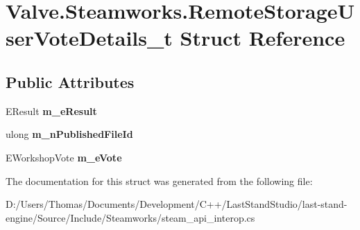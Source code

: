 \hypertarget{structValve_1_1Steamworks_1_1RemoteStorageUserVoteDetails__t}{}\section{Valve.\+Steamworks.\+Remote\+Storage\+User\+Vote\+Details\+\_\+t Struct Reference}
\label{structValve_1_1Steamworks_1_1RemoteStorageUserVoteDetails__t}
\subsection*{Public Attributes}
\begin{DoxyCompactItemize}
\item 
\hypertarget{structValve_1_1Steamworks_1_1RemoteStorageUserVoteDetails__t_aded5ded451f9b1c8fd76ea23b7223560}{}E\+Result {\bfseries m\+\_\+e\+Result}\label{structValve_1_1Steamworks_1_1RemoteStorageUserVoteDetails__t_aded5ded451f9b1c8fd76ea23b7223560}

\item 
\hypertarget{structValve_1_1Steamworks_1_1RemoteStorageUserVoteDetails__t_a242a1da18fe77c1ed70e9a0a491e975a}{}ulong {\bfseries m\+\_\+n\+Published\+File\+Id}\label{structValve_1_1Steamworks_1_1RemoteStorageUserVoteDetails__t_a242a1da18fe77c1ed70e9a0a491e975a}

\item 
\hypertarget{structValve_1_1Steamworks_1_1RemoteStorageUserVoteDetails__t_aaaee056f161528e532c8bc236c808903}{}E\+Workshop\+Vote {\bfseries m\+\_\+e\+Vote}\label{structValve_1_1Steamworks_1_1RemoteStorageUserVoteDetails__t_aaaee056f161528e532c8bc236c808903}

\end{DoxyCompactItemize}


The documentation for this struct was generated from the following file\+:\begin{DoxyCompactItemize}
\item 
D\+:/\+Users/\+Thomas/\+Documents/\+Development/\+C++/\+Last\+Stand\+Studio/last-\/stand-\/engine/\+Source/\+Include/\+Steamworks/steam\+\_\+api\+\_\+interop.\+cs\end{DoxyCompactItemize}

